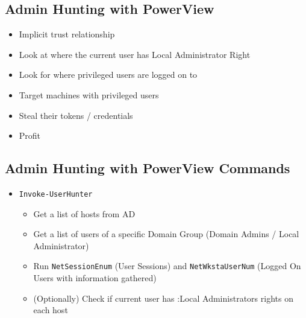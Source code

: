 \subsection{Admin Hunting with PowerView}
\begin{itemize}
    \item Implicit trust relationship
    \item Look at where the current user has Local Administrator Right
    \item Look for where privileged users are logged on to
    \item Target machines with privileged users
    \item Steal their tokens / credentials
    \item Profit
\end{itemize}

\subsection{Admin Hunting with PowerView Commands}
\begin{itemize}
    \item \texttt{Invoke-UserHunter}
    \begin{itemize}
        \item Get a list of hosts from AD
        \item Get a list of users of a specific Domain Group (Domain Admins / Local Administrator)
        \item Run \texttt{NetSessionEnum} (User Sessions) and \texttt{NetWkstaUserNum} (Logged On Users with information gathered)
        \item (Optionally) Check if current user has :Local Administrators rights on each host
    \end{itemize}
\end{itemize}











